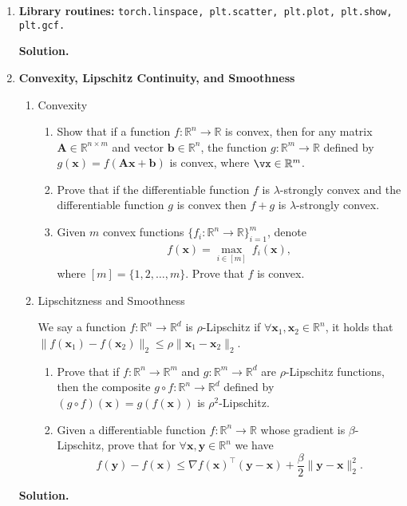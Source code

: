 \documentclass{article}
\theoremstyle{definition}
\theoremstyle{remark}
\newenvironment{Q}
        {%
          \clearpage
          \item
        }
        {%
          \phantom{s} %
          \bigskip
          \textbf{Solution.}
        }
\begin{document}
\begin{enumerate}[font={\Large\bfseries},left=0pt]
\begin{Q}
\begin{enumerate}
\textbf{Library routines:} \texttt{torch.linspace, plt.scatter, plt.plot, plt.show, plt.gcf.}
\end{enumerate}
\end{Q}


\begin{Q}
\textbf{\Large Convexity, Lipschitz Continuity, and Smoothness}
\begin{enumerate}
    \item Convexity
    \begin{enumerate}
        \item Show that if a function $f: \mathbb{R}^n \rightarrow \mathbb{R}$ is convex, then for any matrix $\bm{A} \in \mathbb{R}^{n \times m}$ and vector $\bm{b}\in\mathbb{R}^n $, the function $g:\mathbb{R}^m\to \mathbb{R}$ defined by $g(\bm{x})=f(\bm{Ax}+\bm{b})$ is convex, where $\vx \in \mathbb{R}^m$.
    \item Prove that if the differentiable function $f$ is $\lambda$-strongly convex and the differentiable function $g$ is convex then $f+g$ is $\lambda$-strongly convex.
    \item Given $m$ convex functions $\{f_i:\mathbb{R}^n\to \mathbb{R}\}_{i=1}^m$, denote
    \begin{align}
        f(\bm{x})=\max_{i\in [m]} \ f_i(\bm{x}),
    \end{align}
    where $[m]=\{1,2,\dots,m\}$. Prove that $f$ is convex.
    \end{enumerate}
    \item Lipschitzness and Smoothness
    
    We say a function $f: \mathbb{R}^n \rightarrow \mathbb{R}^d$ is $\rho$-Lipschitz if $\forall \bm{x}_1, \bm{x}_2 \in \mathbb{R}^n $, it holds that
    $\| f(\bm{x}_1) - f(\bm{x}_2)\|_2 \leq \rho \| \bm{x}_1 - \bm{x}_2\|_2$.
    
    \begin{enumerate}
        
    \item Prove that if $f : \mathbb{R}^n \rightarrow \mathbb{R}^m$ and $g : \mathbb{R}^m\rightarrow \mathbb{R}^d$ are $\rho$-Lipschitz functions, then the composite $g\circ f:\mathbb{R}^n\rightarrow \mathbb{R}^d$ defined by $(g\circ f)(\bm{x})=g(f(\bm{x}))$ is $\rho^2$-Lipschitz.

    \item Given a differentiable function $f:\mathbb{R}^n\to \mathbb{R}$ whose gradient is $\beta$-Lipschitz, prove that for $\forall \bm{x}, \bm{y}\in \mathbb{R}^n$ we have
    $$
       f(\bm{y})-f(\bm{x})\leq \nabla f(\bm{x})^\top (\bm{y}-\bm{x}) +\frac{\beta}{2}\|\bm{y}-\bm{x}\|^2_2.
    $$
    

\end{enumerate}
\end{enumerate}
\end{Q}
\end{enumerate}
\end{document}
